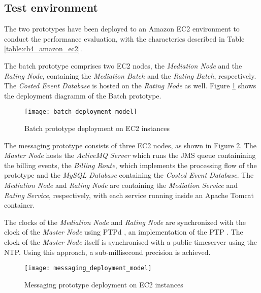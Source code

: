 \subsection{Test environment}

The two prototypes have been deployed to an Amazon EC2 environment to conduct the performance evaluation, with the characterics described in Table \ref{table:ch4_amazon_ec2}.

The batch prototype comprises two EC2 nodes, the \emph{Mediation Node} and the \emph{Rating Node}, containing the \emph{Mediation Batch} and the \emph{Rating Batch}, respectively. The \emph{Costed Event Database} is hosted on the \emph{Rating Node} as well. Figure \ref{fig:ch4_batch_deployment_model} shows the deployment diagramm of the Batch prototype.

\begin{figure}[htbp]
	\centering
	\texttt{[image: batch\_deployment\_model]}
	\caption{Batch prototype deployment on EC2 instances}
	\label{fig:ch4_batch_deployment_model}
\end{figure}

The messaging prototype consists of three EC2 nodes, as shown in Figure \ref{fig:ch4_messaging_deployment_model}. The \emph{Master Node} hosts the \emph{ActiveMQ Server} which runs the JMS queue containining the billing events, the \emph{Billing Route}, which implements the processing flow of the prototype and the \emph{MySQL Database} containing the \emph{Costed Event Database}. The \emph{Mediation Node} and \emph{Rating Node} are containing the \emph{Mediation Service} and \emph{Rating Service}, respectively, with each service running inside an Apache Tomcat container.

The clocks of the \emph{Mediation Node} and \emph{Rating Node} are synchronized with the clock of the \emph{Master Node} using PTPd \citep{ptpd}, an implementation of the \ac{PTP} \citep{IEEE_PTP}. The clock of the \emph{Master Node} itself is synchronised with a public timeserver using the \ac{NTP}. Using this approach, a sub-millisecond precision is achieved.

\begin{figure}[htbp]
	\centering
	\texttt{[image: messaging\_deployment\_model]}
	\caption{Messaging prototype deployment on EC2 instances}
	\label{fig:ch4_messaging_deployment_model}
\end{figure}

